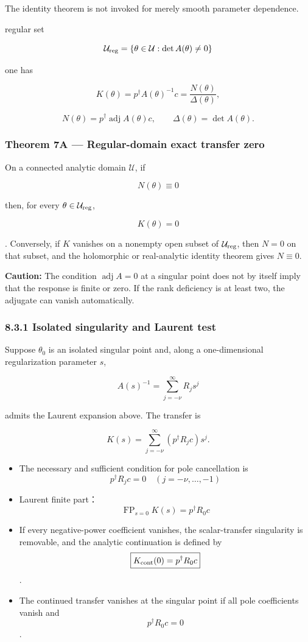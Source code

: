 \documentclass[
  10pt,
  a4paper,
]{article}
\providecommand{\tightlist}{%
  \setlength{\itemsep}{0pt}\setlength{\parskip}{0pt}}
\begin{document}
The identity theorem is not invoked for merely smooth parameter
dependence.

regular set

\[
\mathcal U_{\rm reg}
=\{\theta\in\mathcal U:\det A(\theta)\neq0\}
\]

one has

\[
K(\theta)
=p^\dagger A(\theta)^{-1}c
=
\frac{N(\theta)}{\Delta(\theta)},
\]

\[
N(\theta)=p^\dagger\operatorname{adj}A(\theta)c,
\qquad
\Delta(\theta)=\det A(\theta).
\]

\subsubsection{Theorem 7A --- Regular-domain exact transfer
zero}\label{theorem-7a-regular-domain-exact-transfer-zero}

On a connected analytic domain \(\mathcal U\), if

\[
\boxed{N(\theta)\equiv0}
\]

then, for every \(\theta\in\mathcal U_{\rm reg}\),

\[
\boxed{K(\theta)=0}
\]

. Conversely, if \(K\) vanishes on a nonempty open subset of
\(\mathcal U_{\rm reg}\), then \(N=0\) on that subset, and the
holomorphic or real-analytic identity theorem gives \(N\equiv0\).

\textbf{Caution:} The condition \(\operatorname{adj}A=0\) at a singular
point does not by itself imply that the response is finite or zero. If
the rank deficiency is at least two, the adjugate can vanish
automatically.

\subsubsection{8.3.1 Isolated singularity and Laurent
test}\label{isolated-singularity-and-laurent-test}

Suppose \(\theta_0\) is an isolated singular point and, along a
one-dimensional regularization parameter \(s\),

\[
A(s)^{-1}
=\sum_{j=-\nu}^{\infty}R_j s^j
\]

admits the Laurent expansion above. The transfer is

\[
K(s)=\sum_{j=-\nu}^{\infty}
\left(p^\dagger R_jc\right)s^j.
\]

\begin{itemize}
\tightlist
\item
  The necessary and sufficient condition for pole cancellation is \[
  p^\dagger R_jc=0
  \quad(j=-\nu,\ldots,-1)
  \]
\item
  Laurent finite part： \[
  \boxed{
  \operatorname{FP}_{s=0}K(s)
  =p^\dagger R_0c
  }
  \]
\item
  If every negative-power coefficient vanishes, the scalar-transfer
  singularity is removable, and the analytic continuation is defined by
  \[
  \boxed{
  K_{\rm cont}(0)=p^\dagger R_0c
  }
  \] .
\item
  The continued transfer vanishes at the singular point if all pole
  coefficients vanish and \[
  p^\dagger R_0c=0
  \] .
\end{itemize}
\end{document}
